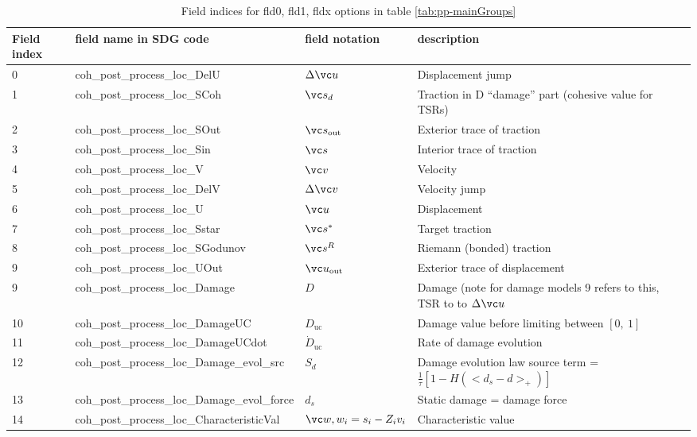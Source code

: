 \documentclass[10pt]{article}
\begin{document}
\begin{table}[t]
\caption{Field indices for fld0, fld1, fldx options in table \ref{tab:pp-mainGroups}}
\label{tab:pp-fldInd}
\begin{center}
\begin{tabular}{ | p{2.0cm} | p{6.0cm} | p{2.5cm} | p{6.0cm} | }
\hline 
Field index  & field name in SDG code & field notation & description \\
\hline 
0 & coh\_post\_process\_loc\_DelU	& $\Delta \vc u$ & Displacement jump \\
\hline 
1 & coh\_post\_process\_loc\_SCoh & $\vc s_d$ & Traction in  D ``damage'' part (cohesive value for TSRs) \\
\hline 
2 & coh\_post\_process\_loc\_SOut & $\vc s_{\mathrm{out}}$ & Exterior trace of traction \\
\hline 
3 & coh\_post\_process\_loc\_Sin  & $\vc s$ & Interior trace of traction \\
\hline 
4 & coh\_post\_process\_loc\_V & $\vc v$ & Velocity \\
\hline 
5 & coh\_post\_process\_loc\_DelV & $\Delta \vc v$ & Velocity jump \\
\hline 
6 & coh\_post\_process\_loc\_U & $\vc u$ & Displacement \\
\hline 
7 & coh\_post\_process\_loc\_Sstar & $\vc s^*$ & Target traction \\
\hline 
8 & coh\_post\_process\_loc\_SGodunov & $\vc s^R$ & Riemann (bonded) traction \\
\hline 
9 & coh\_post\_process\_loc\_UOut		& $\vc u_{\mathrm{out}}$ & Exterior trace of displacement \\
\hline 
9 & coh\_post\_process\_loc\_Damage & $D$ & Damage (note for damage models 9 refers to this, TSR to to $\Delta \vc u$ \\
\hline 
10 & coh\_post\_process\_loc\_DamageUC & $D_{\mathrm{uc}}$ & Damage value before limiting between $[0,\  1]$ \\
\hline 
11 & coh\_post\_process\_loc\_DamageUCdot & $\dot{D}_{\mathrm{uc}}$ & Rate of damage evolution \\
\hline 
12 & coh\_post\_process\_loc\_Damage\_evol\_src & $S_d$ & Damage evolution law source term = $\frac{1}{\tau}[1 - H(<d_s - d>_+)]$\\
\hline 
13 & coh\_post\_process\_loc\_Damage\_evol\_force & $d_s$ & Static damage = damage force \\ 
\hline 
14 & coh\_post\_process\_loc\_CharacteristicVal & $\vc w, w_i = s_i - Z_i v_i$ & Characteristic value \\

\end{tabular}
\end{center}
\end{table}
\end{document}
